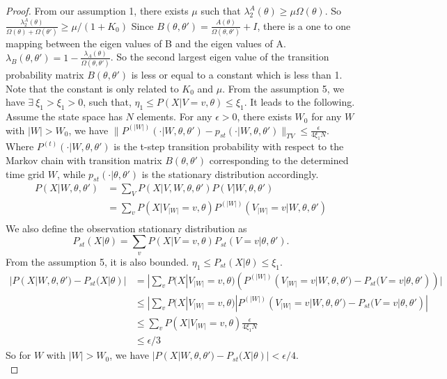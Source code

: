 \begin{proof}
From our assumption 1, there exists $\mu$ such that $\lambda^A_2(\theta) \geq \mu \Omega(\theta)$. So $\frac{\lambda^A_2(\theta)}{\Omega(\theta) + \Omega(\theta')} \geq \mu / (1 + K_0) $ Since $B(\theta, \theta') = \frac{A(\theta)}{\Omega(\theta, \theta')} + I $, there is a one to one mapping between the eigen values of B and the eigen values of A. $\lambda_B(\theta, \theta') = 1 - \frac{\lambda_A(\theta)}{\Omega(\theta, \theta')}$. So the second largest eigen value of the transition probability matrix $B(\theta, \theta')$ is less or equal to a constant which is less than 1. Note that the constant is only related to $K_0$ and $\mu$. From the assumption 5, we have $\exists \ \xi_1 > \xi_1 > 0$, such that, $ \eta_1 \leq P(X | V=v, \theta) \leq \xi_1$. It leads to the following. Assume the state space has $N$ elements. For any $\epsilon > 0$, there exists $W_0$ for any $W$ with $|W| > W_0$, we have $\parallel P^{(|W|)}(\cdot | W, \theta, \theta') - p_{st}(\cdot | W, \theta, \theta')\parallel_{TV} \leq \frac{\epsilon}{4\xi_1N} $. Where $P^{(t)}(\cdot | W, \theta, \theta' )$
 is the t-step transition probability with respect to the Markov chain with transition matrix $B(\theta, \theta')$ corresponding to the determined time grid $W$, while $p_{st}(\cdot | \theta, \theta')$ is the stationary distribution accordingly.
\begin{align*}
P(X|W , \theta, \theta') &= \sum_V P(X | V, W, \theta, \theta') P(V | W, \theta, \theta')\\
&= \sum_{v} P(X | V_{|W|}=v, \theta) P^{(|W|)}(V_{|W|}=v | W, \theta, \theta')\\
\end{align*}
 We also define the observation stationary distribution as $$P_{st}(X | \theta) = \sum_{v} P(X | V=v, \theta) P_{st}(V=v | \theta, \theta').$$
 From the assumption 5, it is also bounded. $\eta_1 \leq P_{st}(X | \theta) \leq \xi_1$.
\begin{align*}
|P(X|W , \theta, \theta') - P_{st}(X | \theta)| &= | \sum_{v} P(X | V_{|W|}=v, \theta)(P^{(|W|)}(V_{|W|}=v | W, \theta, \theta') -  P_{st}(V=v | \theta, \theta'))|\\
& \leq |\sum_{v} P(X | V_{|W|}=v, \theta)|P^{(|W|)}(V_{|W|}=v | W, \theta, \theta') -  P_{st}(V=v | \theta, \theta')|\\
& \leq \sum_{v} P(X | V_{|W|}=v, \theta)\frac{\epsilon}{4\xi_1N}\\
& \leq \epsilon / 3
\end{align*}
So for $W$ with $|W| > W_0$, we have  $|P(X| W, \theta, \theta') - P_{st}(X | \theta)| < \epsilon / 4$. \\

\end{proof}
